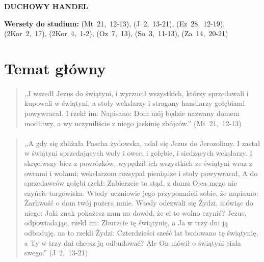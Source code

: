 \documentclass[10pt,a4paper,oneside]{article}
\begin{document}
\centerline{\textbf{\MakeUppercase{Duchowy handel}}}
\begin{center}
\textbf{Wersety do studium:} 
\mbox{(Mt 21, 12-13)}, \mbox{(J 2, 13-21)}, \mbox{(Ez 28, 12-19)}, \mbox{(2Kor 2, 17)}, \mbox{(2Kor 4, 1-2)}, \mbox{(Oz 7, 13)}, \mbox{(So 3, 11-13)}, \mbox{(Za 14, 20-21)}
\end{center}
\section{Temat główny}
\paragraph{}
\begin{quote}
,,I wszedł Jezus do świątyni, i wyrzucił wszystkich, którzy sprzedawali i kupowali w świątyni, a stoły wekslarzy i stragany handlarzy gołębiami powywracał. I rzekł im: Napisano: Dom mój będzie nazwany domem modlitwy, a wy uczyniliście z niego jaskinię zbójców.'' \mbox{(Mt 21, 12-13)}
\end{quote}
\paragraph{}
\begin{quote}
,,A gdy się zbliżała Pascha żydowska, udał się Jezus do Jerozolimy. I zastał w świątyni sprzedających woły i owce, i gołębie, i siedzących wekslarzy. I skręciwszy bicz z powrózków, wypędził ich wszystkich ze świątyni wraz z owcami i wołami; wekslarzom rozsypał pieniądze i stoły powywracał, A do sprzedawców gołębi rzekł: Zabierzcie to stąd, z domu Ojca mego nie czyńcie targowiska. Wtedy uczniowie jego przypomnieli sobie, że napisano: Żarliwość o dom twój pożera mnie. Wtedy odezwali się Żydzi, mówiąc do niego: Jaki znak pokażesz nam na dowód, że ci to wolno czynić? Jezus, odpowiadając, rzekł im: Zburzcie tę świątynię, a Ja w trzy dni ją odbuduję. na to rzekli Żydzi: Czterdzieści sześć lat budowano tę świątynię, a Ty w trzy dni chcesz ją odbudować? Ale On mówił o świątyni ciała swego.'' \mbox{(J 2, 13-21)}
\end{quote}
\end{document}
